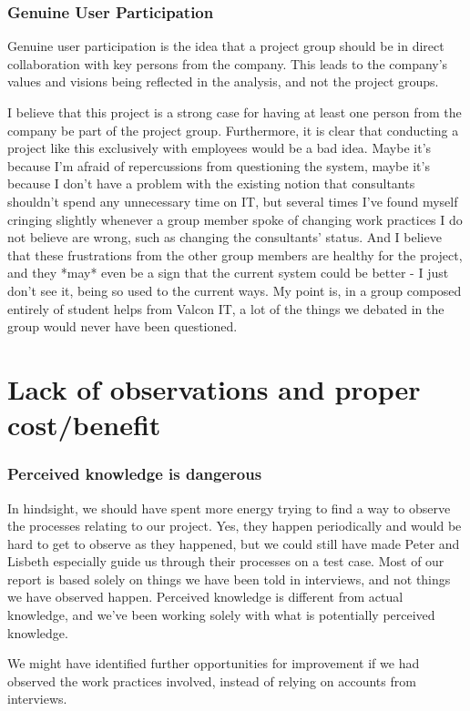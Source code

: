 \subsubsection{Genuine User Participation}
Genuine user participation is the idea that a project group should be in direct collaboration with key persons from the company. This leads to the company's values and visions being reflected in the analysis, and not the project groups.

I believe that this project is a strong case for having at least one person from the company be part of the project group. Furthermore, it is clear that conducting a project like this exclusively with employees would be a bad idea. Maybe it's because I'm afraid of repercussions from questioning the system, maybe it's because I don't have a problem with the existing notion that consultants shouldn't spend any unnecessary time on IT, but several times I've found myself cringing slightly whenever a group member spoke of changing work practices I do not believe are wrong, such as changing the consultants' status.
And I believe that these frustrations from the other group members are healthy for the project, and they *may* even be a sign that the current system could be better - I just don't see it, being so used to the current ways. My point is, in a group composed entirely of student helps from Valcon IT, a lot of the things we debated in the group would never have been questioned.


\section*{Lack of observations and proper cost/benefit}
\subsubsection{Perceived knowledge is dangerous}
In hindsight, we should have spent more energy trying to find a way to observe the processes relating to our project. Yes, they happen periodically and would be hard to get to observe as they happened, but we could still have made Peter and Lisbeth especially guide us through their processes on a test case. Most of our report is based solely on things we have been told in interviews, and not things we have observed happen. Perceived knowledge is different from actual knowledge, and we've been working solely with what is potentially perceived knowledge.

We might have identified further opportunities for improvement if we had observed the work practices involved, instead of relying on accounts from interviews.

